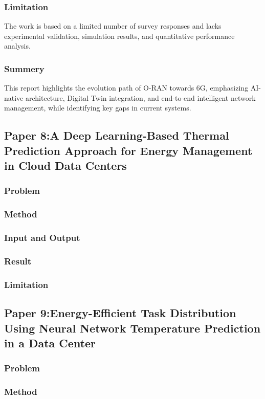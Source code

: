 \documentclass[12pt,a4paper]{article}
\begin{document}
    \subsubsection{Limitation}
    The work is based on a limited number of survey responses and lacks experimental validation, simulation results, and quantitative performance analysis.

    \subsubsection{Summery}
    This report highlights the evolution path of O-RAN towards 6G, emphasizing AI-native architecture, Digital Twin integration, and end-to-end intelligent network management, while identifying key gaps in current systems.
\newpage

\subsection{Paper 8:A Deep Learning-Based Thermal Prediction Approach for Energy Management in Cloud Data Centers}
    \subsubsection{Problem}
    \subsubsection{Method}
    \subsubsection{Input and Output}
    \subsubsection{Result}
    \subsubsection{Limitation}
\newpage

\subsection{Paper 9:Energy-Efficient Task Distribution Using Neural Network Temperature Prediction in a Data Center}
    \subsubsection{Problem}
    \subsubsection{Method}
\end{document}
